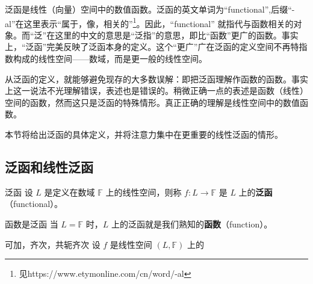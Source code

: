 
\cite{Ke1}泛函是线性（向量）空间中的数值函数。泛函的英文单词为“functional”,后缀“-al”在这里表示“属于，像，相关的”\footnote{见https://www.etymonline.com/cn/word/-al}。因此，“functional” 就指代与函数相关的对象。而“泛”在这里的中文的意思是“泛指”的意思，即比“函数”更广的函数。事实上，“泛函”完美反映了泛函本身的定义。这个“更广”广在泛函的定义空间不再特指数构成的线性空间——数域，而是更一般的线性空间。

从泛函的定义，就能够避免现存的大多数误解：即把泛函理解作函数的函数。事实上这一说法不光理解错误，表述也是错误的。稍微正确一点的表述是函数（线性）空间的函数，然而这只是泛函的特殊情形。真正正确的理解是线性空间中的数值函数。

本节将给出泛函的具体定义，并将注意力集中在更重要的线性泛函的情形。

\subsection{泛函和线性泛函}
\begin{definition}{泛函}
设 $L$ 是定义在数域 $\mathbb F$ 上的线性空间，则称 $f:L\rightarrow\mathbb F$ 是 $L$ 上的\textbf{泛函}（functional）。
\end{definition}

\begin{example}{函数是泛函}
当 $L=\mathbb F$ 时，$L$ 上的泛函就是我们熟知的\textbf{函数}（function）。
\end{example}

\begin{definition}{可加，齐次，共轭齐次}
设 $f$ 是线性空间 $(L,\mathbb F)$ 上的
\end{definition}











